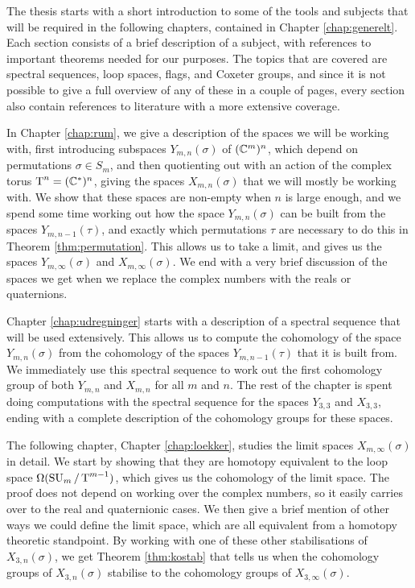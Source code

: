 The thesis starts with a short introduction to some of the tools and
subjects that
will be required in the following chapters, contained in Chapter
\ref{chap:generelt}. Each section consists of a brief description of
a subject, with references to
important theorems needed for our purposes. The topics that are
covered are spectral
sequences, loop spaces, flags, and Coxeter groups, and since it is not
possible to give a full overview of any of these in a couple of
pages, every section also contain references to literature with a
more extensive coverage.

In Chapter \ref{chap:rum}, we give a description of the spaces we will
be working with, first introducing subspaces $Y_{m,n}(\sigma)$ of
$(\mathbb{C}^{m})^{n}$, which depend on permutations $\sigma\in S_m$, and
then quotienting out with an action of the complex torus $\operatorname{T}^n =
(\mathbb{C}^*)^n$, giving the spaces $X_{m,n}(\sigma)$ that we will mostly be
working with. We show that these spaces are non-empty when $n$ is
large enough, and we spend some time working out how the space
$Y_{m,n}(\sigma)$ can be built from the spaces $Y_{m,n-1}(\tau)$, and
exactly which permutations $\tau$ are necessary to do this in Theorem
\ref{thm:permutation}. This
allows us to take a limit, and gives us the spaces
$Y_{m,\infty}(\sigma)$ and $X_{m,\infty}(\sigma)$. We end
with a very brief discussion of the spaces we get when we replace the
complex numbers with the reals or quaternions.

Chapter \ref{chap:udregninger} starts with a description of a spectral
sequence that will be used extensively. This allows us to compute the
cohomology of the space $Y_{m,n}(\sigma)$ from the cohomology of the
spaces $Y_{m,n-1}(\tau)$ that it is built from. We immediately use
this spectral sequence to work out the first cohomology group of both
$Y_{m,n}$ and $X_{m,n}$ for all $m$ and $n$. The rest of the
chapter is spent doing computations with the spectral sequence for the
spaces $Y_{3,3}$ and
$X_{3,3}$, ending with a complete description of the cohomology
groups for these spaces.

The following chapter, Chapter \ref{chap:loekker}, studies the limit
spaces $X_{m,\infty}(\sigma)$ in detail. We start by showing that they
are homotopy equivalent to the loop space $\Omega(\operatorname{SU}_{m}/\operatorname{T}^{m-1})$, which
gives us the cohomology of the limit space. The proof does not depend
on working over the complex numbers, so it easily carries over to the
real and quaternionic cases. We then give a brief
mention of other ways we could define the limit space, which are all
equivalent from a homotopy theoretic standpoint. By working
with one of these other stabilisations of $X_{3,n}(\sigma)$, we get
Theorem \ref{thm:kostab}
that tells us when the cohomology groups of
$X_{3,n}(\sigma)$ stabilise to the cohomology groups of
$X_{3,\infty}(\sigma)$.

